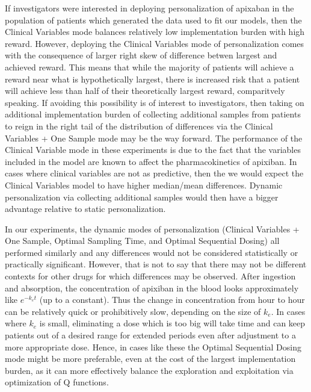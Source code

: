 If investigators were interested in deploying personalization of apixaban in the population of patients which generated the data used to fit our models, then the Clinical Variables mode balances relatively low implementation burden with high reward. However, deploying the Clinical Variables mode of personalization comes with the consequence of larger right skew of difference betwen largest and achieved reward.  This means that while the majority of patients will achieve a reward near what is hypothetically largest, there is increased risk that a patient will achieve less than half of their theoretically largest reward, comparitvely speaking.  If avoiding this possibility is of interest to investigators, then taking on additional implementation burden of collecting additional samples from patients to reign in the right tail of the distribution of differences via the Clinical Variables + One Sample mode may be the way forward.  The performance of the Clinical Variable mode in these experiments is due to the fact that the variables included in the model are known to affect the pharmacokinetics of apixiban.  In cases where clinical variables are not as predictive, then the we would expect the Clinical Variables model to have higher median/mean differences.  Dynamic personalization via collecting additional samples would then have a bigger advantage relative to static personalization.

In our experiments, the dynamic modes of personalization (Clinical Variables + One Sample, Optimal Sampling Time, and Optimal Sequential Dosing) all performed similarly and any differences would not be considered statistically or practically significant.  However, that is not to say that there may not be different contexts for other drugs for which differences may be observed.  After ingestion and absorption, the concentration of apixiban in the blood looks approximately like $e^{-k_e t}$ (up to a constant).  Thus the change in concentration from hour to hour can be relatively quick or prohibitively slow, depending on the size of $k_e$.  In cases where $k_e$ is small, eliminating a dose which is too big will take time and can keep patients out of a desired range for extended periods even after adjustment to a more appropriate dose.  Hence, in cases like these the Optimal Sequential Dosing mode might be more preferable, even at the cost of the largest implementation burden, as it can more effectively balance the exploration and exploitation via optimization of Q functions.

